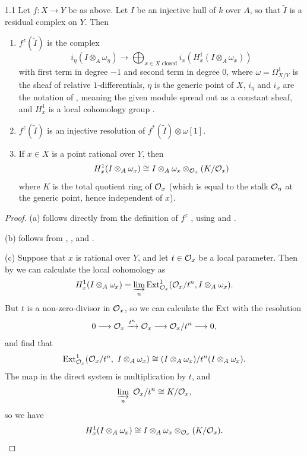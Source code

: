 \begin{bookproposition}{1.1}\label{prop:7.1.1}
Let $f: X \to Y$ be as above. Let $I$ be an injective hull of $k$ over $A$, so that $\widetilde{I}$ is a residual complex on $Y$. Then
\begin{enumerate}
\item[(a)] $f^{z}(\widetilde{I})$ is the complex
\[
i_{\eta}(I \otimes_{A} \omega_{\eta}) \xrightarrow{} \bigoplus_{x \in X\text{ closed}}i_{x}(H_{x}^{1}(I \otimes_{A} \omega_{x}))
\]
with first term in degree $-1$ and second term in degree $0$,
where $\omega = \Omega_{X/Y}^1$ is the sheaf of relative $1$-differentials, $\eta$ is the generic point of $X$, $i_{\eta}$ and $i_{x}$ are the notation of , meaning the given module spread out as a constant sheaf, and $H_{x}^{1}$ is a local cohomology group .

\item[(b)] $f^{z}(\widetilde{I})$ is an injective resolution of $f^{*}(\widetilde{I}) \otimes \omega[1]$.

\item[(c)] If $x \in X$ is a point rational over $Y$, then
\[
H_{x}^{1}(I \otimes_{A} \omega_{x}) \cong I \otimes_{A} \omega_{x} \otimes_{\mathcal{O}_x} (K/\mathcal{O}_{x})
\]
where $K$ is the total quotient ring of $\mathcal{O}_{x}$ (which is equal to the stalk $\mathcal{O}_{\eta}$ at the generic point, hence independent of $x$).
\end{enumerate}
\end{bookproposition}

\begin{proof}
(a) follows directly from the definition of $f^{z}$ , using  and .

(b) follows from , , and .

(c) Suppose that $x$ is rational over $Y$, and let $t \in \mathcal{O}_x$ be a local parameter. Then by  we can calculate the local cohomology as
\[
H_{x}^{1}(I \otimes_{A} \omega_{x}) = \varinjlim_{n} \operatorname{Ext}_{\mathcal{O}_{x}}^{1}(\mathcal{O}_{x}/t^{n}, I \otimes_{A} \omega_{x}).
\]
But $t$ is a non-zero-divisor in $\mathcal{O}_{x}$, so we can calculate the Ext with the resolution
\[
0 \longrightarrow \mathcal{O}_{x} \xrightarrow{t^{n}} \mathcal{O}_{x} \longrightarrow \mathcal{O}_{x}/t^{n} \longrightarrow 0,
\]
and find that
\[
\operatorname{Ext}_{\mathcal{O}_{x}}^{1}(\mathcal{O}_{x}/t^{n},\ I \otimes_{A} \omega_{x}) \cong (I \otimes_{A} \omega_{x})/t^{n}(I \otimes_{A} \omega_{x}).
\]
The map in the direct system is multiplication by $t$, and
\[
\varinjlim_{n} \ \mathcal{O}_{x}/t^{n} \cong K/\mathcal{O}_{x},
\]
so we have
\[
H_{x}^{1}(I \otimes_{A} \omega_{x}) \cong I \otimes_{A} \omega_{x} \otimes_{\mathcal{O}_x} (K/\mathcal{O}_{x}).
\]
\end{proof}

